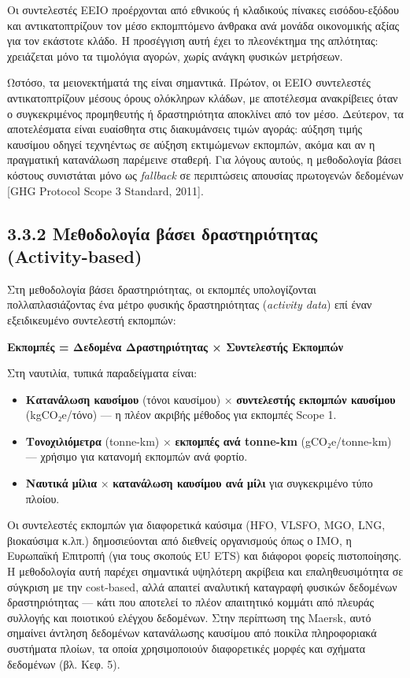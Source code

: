 Οι συντελεστές EEIO προέρχονται από εθνικούς ή κλαδικούς πίνακες
εισόδου-εξόδου και αντικατοπτρίζουν τον μέσο εκπομπτόμενο άνθρακα ανά
μονάδα οικονομικής αξίας για τον εκάστοτε κλάδο. Η προσέγγιση αυτή έχει
το πλεονέκτημα της απλότητας: χρειάζεται μόνο τα τιμολόγια αγορών, χωρίς
ανάγκη φυσικών μετρήσεων.

Ωστόσο, τα μειονεκτήματά της είναι σημαντικά. Πρώτον, οι EEIO
συντελεστές αντικατοπτρίζουν μέσους όρους ολόκληρων κλάδων, με
αποτέλεσμα ανακρίβειες όταν ο συγκεκριμένος προμηθευτής ή δραστηριότητα
αποκλίνει από τον μέσο. Δεύτερον, τα αποτελέσματα είναι ευαίσθητα στις
διακυμάνσεις τιμών αγοράς: αύξηση τιμής καυσίμου οδηγεί τεχνηέντως σε
αύξηση εκτιμώμενων εκπομπών, ακόμα και αν η πραγματική κατανάλωση
παρέμεινε σταθερή. Για λόγους αυτούς, η μεθοδολογία βάσει κόστους
συνιστάται μόνο ως \emph{fallback} σε περιπτώσεις απουσίας πρωτογενών
δεδομένων {[}GHG Protocol Scope 3 Standard, 2011{]}.

\subsection{3.3.2 Μεθοδολογία βάσει δραστηριότητας
(Activity-based)}\label{ux3bcux3b5ux3b8ux3bfux3b4ux3bfux3bbux3bfux3b3ux3afux3b1-ux3b2ux3acux3c3ux3b5ux3b9-ux3b4ux3c1ux3b1ux3c3ux3c4ux3b7ux3c1ux3b9ux3ccux3c4ux3b7ux3c4ux3b1ux3c2-activity-based}

Στη μεθοδολογία βάσει δραστηριότητας, οι εκπομπές υπολογίζονται
πολλαπλασιάζοντας ένα μέτρο φυσικής δραστηριότητας (\emph{activity
data}) επί έναν εξειδικευμένο συντελεστή εκπομπών:

\textbf{Εκπομπές = Δεδομένα Δραστηριότητας × Συντελεστής Εκπομπών}

Στη ναυτιλία, τυπικά παραδείγματα είναι:

\begin{itemize}
\tightlist
\item
  \textbf{Κατανάλωση καυσίμου} (τόνοι καυσίμου) × \textbf{συντελεστής
  εκπομπών καυσίμου} (kgCO₂e/τόνο) --- η πλέον ακριβής μέθοδος για
  εκπομπές Scope 1.
\item
  \textbf{Τονοχιλιόμετρα} (tonne-km) × \textbf{εκπομπές ανά tonne-km}
  (gCO₂e/tonne-km) --- χρήσιμο για κατανομή εκπομπών ανά φορτίο.
\item
  \textbf{Ναυτικά μίλια} × \textbf{κατανάλωση καυσίμου ανά μίλι} για
  συγκεκριμένο τύπο πλοίου.
\end{itemize}

Οι συντελεστές εκπομπών για διαφορετικά καύσιμα (HFO, VLSFO, MGO, LNG,
βιοκαύσιμα κ.λπ.) δημοσιεύονται από διεθνείς οργανισμούς όπως ο IMO, η
Ευρωπαϊκή Επιτροπή (για τους σκοπούς EU ETS) και διάφοροι φορείς
πιστοποίησης. Η μεθοδολογία αυτή παρέχει σημαντικά υψηλότερη ακρίβεια
και επαληθευσιμότητα σε σύγκριση με την cost-based, αλλά απαιτεί
αναλυτική καταγραφή φυσικών δεδομένων δραστηριότητας --- κάτι που
αποτελεί το πλέον απαιτητικό κομμάτι από πλευράς συλλογής και ποιοτικού
ελέγχου δεδομένων. Στην περίπτωση της Maersk, αυτό σημαίνει άντληση
δεδομένων κατανάλωσης καυσίμου από ποικίλα πληροφοριακά συστήματα
πλοίων, τα οποία χρησιμοποιούν διαφορετικές μορφές και σχήματα δεδομένων
(βλ. Κεφ. 5).

